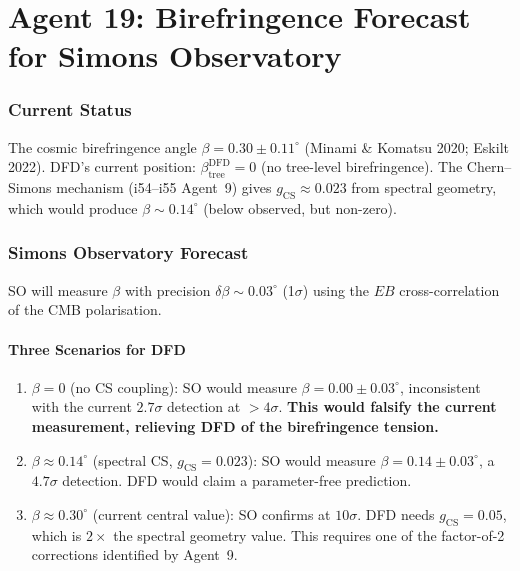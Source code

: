 \documentclass[11pt,a4paper]{article}
\begin{document}
\part{Agent 19: Birefringence Forecast for Simons Observatory}
\label{part:bire-so}

\section{Current Status}

The cosmic birefringence angle $\beta = 0.30 \pm 0.11^\circ$ (Minami \& Komatsu 2020; Eskilt 2022). DFD's current position: $\beta^{\mathrm{DFD}}_{\mathrm{tree}} = 0$ (no tree-level birefringence). The Chern--Simons mechanism (i54--i55 Agent~9) gives $g_{\mathrm{CS}} \approx 0.023$ from spectral geometry, which would produce $\beta \sim 0.14^\circ$ (below observed, but non-zero).

\section{Simons Observatory Forecast}

SO will measure $\beta$ with precision $\delta\beta \sim 0.03^\circ$ (1$\sigma$) using the $EB$ cross-correlation of the CMB polarisation.

\subsection{Three Scenarios for DFD}

\begin{enumerate}
\item \textbf{$\beta = 0$} (no CS coupling): SO would measure $\beta = 0.00 \pm 0.03^\circ$, inconsistent with the current $2.7\sigma$ detection at $> 4\sigma$. \textbf{This would falsify the current measurement, relieving DFD of the birefringence tension.}

\item \textbf{$\beta \approx 0.14^\circ$} (spectral CS, $g_{\mathrm{CS}} = 0.023$): SO would measure $\beta = 0.14 \pm 0.03^\circ$, a $4.7\sigma$ detection. DFD would claim a parameter-free prediction.

\item \textbf{$\beta \approx 0.30^\circ$} (current central value): SO confirms at $10\sigma$. DFD needs $g_{\mathrm{CS}} = 0.05$, which is $2\times$ the spectral geometry value. This requires one of the factor-of-2 corrections identified by Agent~9.
\end{enumerate}
\end{document}
